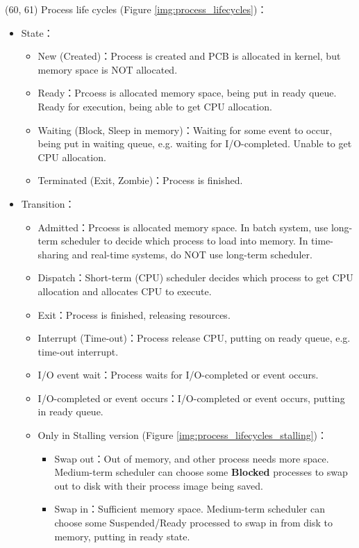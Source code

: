 \begin{theorem}{(60, 61)} Process life cycles (Figure \ref{img:process_lifecycles})： \begin{itemize}
        \item State：\begin{itemize}
            \item New (Created)：Process is created and PCB is allocated in kernel, but memory space is NOT allocated.
            \item Ready：Prcoess is allocated memory space, being put in ready queue. Ready for execution, being able to get CPU allocation.
            \item Waiting (Block, Sleep in memory)：Waiting for some event to occur, being put in waiting queue, e.g. waiting for I/O-completed. Unable to get CPU allocation.
            \item Terminated (Exit, Zombie)：Process is finished.
        \end{itemize}
        \item Transition：\begin{itemize}
            \item Admitted：Prcoess is allocated memory space. In batch system, use long-term scheduler to decide which process to load into memory. In time-sharing and real-time systems, do NOT use long-term scheduler.
            \item Dispatch：Short-term (CPU) scheduler decides which process to get CPU allocation and allocates CPU to execute.
            \item Exit：Process is finished, releasing resources.
            \item Interrupt (Time-out)：Process release CPU, putting on ready queue, e.g. time-out interrupt.
            \item I/O event wait：Process waits for I/O-completed or event occurs.
            \item I/O-completed or event occurs：I/O-completed or event occurs, putting in ready queue.
            \item Only in Stalling version (Figure \ref{img:process_lifecycles_stalling})：\begin{itemize}
                \item Swap out：Out of memory, and other process needs more space. Medium-term scheduler can choose some \textbf{Blocked} processes to swap out to disk with their process image being saved.
                \item Swap in：Sufficient memory space. Medium-term scheduler can choose some Suspended/Ready processed to swap in from disk to memory, putting in ready state.

\end{itemize}
\end{itemize}
\end{itemize}
\end{theorem}
